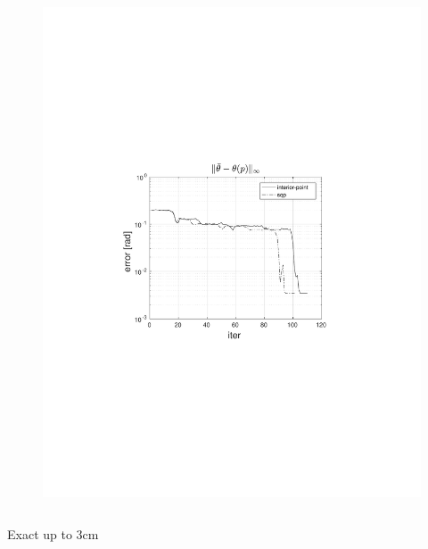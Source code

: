 \begin{frame}
\begin{columns}[t]
\begin{figure}
                \includegraphics[trim=4cm 9cm 4cm 8.5cm, clip=true, width=\linewidth]{img/convPlotT}
            \end{figure}
    \end{columns}

    \begin{center}
        Exact up to $3\text{cm}$
    \end{center}
\end{frame}

